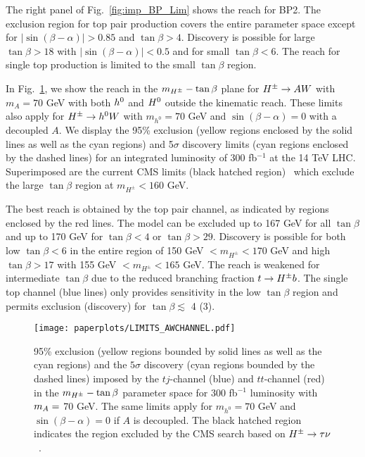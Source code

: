 The right panel of Fig.~\ref{fig:imp_BP_Lim} shows the reach for BP2. The exclusion region for top pair production covers the entire parameter space except for $|\sin(\beta-\alpha)| >0.85$ and $\tan\beta> 4$.    Discovery is   possible for large $\tan\beta>18$ with  $|\sin(\beta-\alpha)|<0.5$ and for small $\tan\beta<6$.    The reach for single top production is limited to the small $\tan\beta$ region.

In Fig.~\ref{fig:imp_Limits},  we show the reach in the $m_{H^{\pm}}-\tan\beta$ plane for $H^{\pm} \to AW$ with $m_A=70$ GeV with both $h^0$ and $H^0$  outside the kinematic reach.   These limits also apply for $H^{\pm} \to h^0W$ with $m_{h^0}=70$ GeV and $\sin(\beta-\alpha)=0$ with a decoupled $A$. We display the 95\% exclusion (yellow regions enclosed by the solid lines as well as the cyan regions)  and 5$\sigma$ discovery limits (cyan regions enclosed by the dashed lines)  for an integrated luminosity of 300 fb$^{-1}$ at the 14 TeV LHC. Superimposed are the current CMS limits (black hatched region)~\cite{CMS:2014cdp} which exclude the large  $\tan\beta$ region at $m_{H^\pm}<160$ GeV. 

The best reach is obtained by the top pair channel, as indicated by regions enclosed by the red lines. The model can be excluded up to 167 GeV for all $\tan\beta$ and up to 170 GeV for $\tan\beta<4$ or $\tan\beta>29$. Discovery is possible for both low $\tan \beta<$6  in the entire region of  150 GeV $< m_{H^\pm}<170$ GeV and high $\tan\beta > 17$ with  155 GeV $< m_{H^\pm}<165$ GeV.    The reach is weakened for intermediate $\tan\beta$ due to the reduced branching fraction $t \to  H^{\pm} b$.   The single top channel (blue lines) only provides sensitivity in the low $\tan\beta$ region and permits exclusion (discovery) for $\tan\beta \lesssim$ 4 (3). 



 \begin{figure}[h!]
 \centering
 	\texttt{[image: paperplots/LIMITS\_AWCHANNEL.pdf]}
\caption{95\% exclusion (yellow regions bounded by solid lines as well as the cyan regions) and the $5\sigma$ discovery (cyan regions bounded by the dashed lines) imposed by the $tj$-channel (blue) and $tt$-channel (red) in the $m_{H^{\pm}}-\tan\beta$ parameter space for 300 fb$^{-1}$ luminosity with $m_A=$ 70 GeV. The same limits apply for $m_{h^0}=70$ GeV and $\sin(\beta-\alpha)=0$ if $A$ is decoupled. The black hatched region indicates the region excluded by the CMS search based on $H^{\pm} \rightarrow \tau \nu$~\cite{CMS:2014cdp}. }
\label{fig:imp_Limits}
\end{figure}

